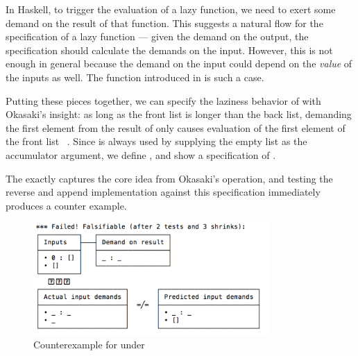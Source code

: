 \documentclass[acmsmall,review]{acmart}\settopmatter{}
\begin{document}
In Haskell, to trigger the evaluation of a lazy function, we need to
exert some demand on the result of that function. This suggests a
natural flow for the specification of a lazy function --- given the
demand on the output, the specification should calculate the demands
on the input. However, this is not enough in general because the
demand on the input could depend on the \textit{value} of the inputs
as well. The  function introduced in  is such
a case.

Putting these pieces together, we can specify the laziness behavior
of  with Okasaki's insight: as long as the front list is
longer than the back list, demanding the first element from the result
of  only causes evaluation of the first element of the
front list ~\cite{Okasaki95simpleand}. Since  is always
used by supplying the empty list \lk{[]} as the accumulator argument,
we define , and show a specification
of .
%
%
The  exactly captures the core idea from Okasaki's 
operation, and testing the reverse and append implementation against this
specification immediately produces a counter example.
\begin{figure}[H]
\centering
\includegraphics[width=0.8\textwidth]{revappend_counterexample}
\caption{Counterexample for  under }
\end{figure}
\end{document}
